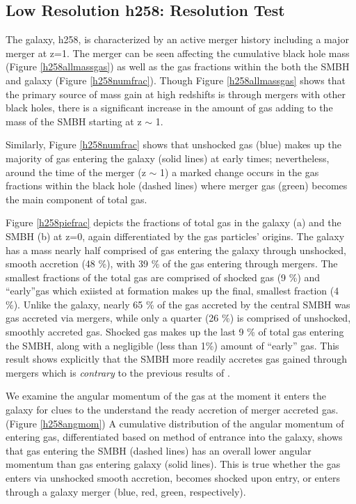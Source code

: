 \documentclass[manuscript]{aastex}
\begin{document}
\subsection{Low Resolution h258: Resolution Test}
	
The galaxy, h258, is characterized by an active merger history including a major merger at z=1. The merger can be seen affecting the cumulative black hole mass (Figure \ref{h258allmassgas}) as well as the gas fractions within the both the SMBH and galaxy (Figure \ref{h258numfrac}). 
Though Figure \ref{h258allmassgas} shows that the primary source of mass gain at high redshifts is through mergers with other black holes, there is a significant increase in the amount of gas adding to the mass of the SMBH starting at z $\sim$ 1. 

Similarly, Figure \ref{h258numfrac} shows that unshocked gas (blue) makes up the majority of gas entering the galaxy (solid lines) at early times; nevertheless, around the time of the merger (z $\sim$ 1) a marked change occurs in the gas fractions within the black hole (dashed lines) where merger gas (green) becomes the main component of total gas. 

Figure \ref{h258piefrac} depicts the fractions of total gas in the galaxy (a) and the SMBH (b) at z=0, again differentiated by the gas particles' origins. The galaxy has a mass nearly half comprised of gas entering the galaxy through unshocked, smooth accretion (48 \%), with 39 \% of the gas entering through mergers. The smallest fractions of the total gas are comprised of shocked gas (9 \%) and ``early''gas which exiisted at formation makes up the final, smallest fraction (4 \%). Unlike the galaxy, nearly 65 \% of the gas accreted by the central SMBH was gas accreted via mergers, while only a quarter (26 \%) is comprised of unshocked, smoothly accreted gas. Shocked gas makes up the last 9 \% of total gas entering the SMBH, along with a negligible (less than 1\%) amount of ``early'' gas. This result shows explicitly that the SMBH more readily accretes gas gained through mergers which is \textit{contrary} to the previous results of \cite{Bellovary2013}.

We examine the angular momentum of the gas at the moment it enters the galaxy for clues to the understand the ready accretion of merger accreted gas. (Figure \ref{h258angmom}) A cumulative distribution of the angular momentum of entering gas, differentiated based on method of entrance into the galaxy, shows that gas entering the SMBH (dashed lines) has an overall lower angular momentum than gas entering galaxy (solid lines). This is true whether the gas enters via unshocked smooth accretion, becomes shocked upon entry, or enters through a galaxy merger (blue, red, green, respectively).
\end{document}
